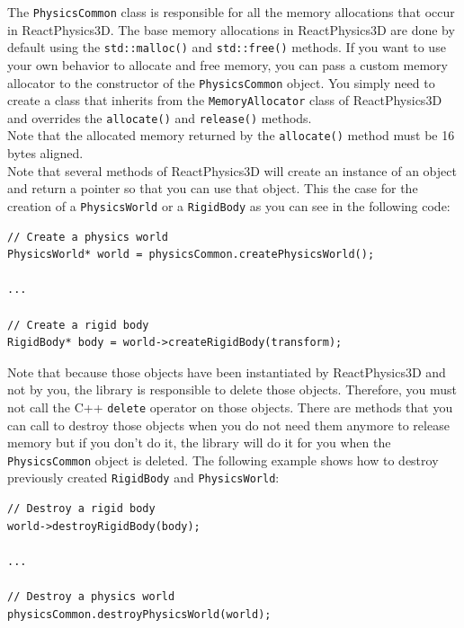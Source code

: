 \documentclass[a4paper,12pt]{article}
\begin{document}
   The \texttt{PhysicsCommon} class is responsible for all the memory allocations that occur in ReactPhysics3D. The base memory allocations in ReactPhysics3D
   are done by default using the \texttt{std::malloc()} and \texttt{std::free()} methods. If you want to use your own behavior to allocate and free
   memory, you can pass a custom memory allocator to the constructor of the \texttt{PhysicsCommon} object. You simply need to create a class
   that inherits from the \texttt{MemoryAllocator} class of ReactPhysics3D and overrides the \texttt{allocate()} and \texttt{release()} methods. \\

   Note that the allocated memory returned by the \texttt{allocate()} method must be 16 bytes aligned. \\

   Note that several methods of ReactPhysics3D will create an instance of an object and return a pointer so that you can use that object. This the case
   for the creation of a \texttt{PhysicsWorld} or a \texttt{RigidBody} as you can see in the following code: \\

   \begin{lstlisting}
// Create a physics world
PhysicsWorld* world = physicsCommon.createPhysicsWorld();

...

// Create a rigid body
RigidBody* body = world->createRigidBody(transform);
   \end{lstlisting}

   \vspace{0.6cm}

   Note that because those objects have been instantiated by ReactPhysics3D and not by you, the library is responsible to delete those objects. Therefore,
   you must not call the C++ \texttt{delete} operator on those objects. There are methods that you can call to destroy those objects when you do not need
   them anymore to release memory but if you don't do it, the library will do it for you when the \texttt{PhysicsCommon} object is deleted. The
   following example shows how to destroy previously created \texttt{RigidBody} and \texttt{PhysicsWorld}: \\

   \begin{lstlisting}
// Destroy a rigid body
world->destroyRigidBody(body);

...

// Destroy a physics world
physicsCommon.destroyPhysicsWorld(world);
   \end{lstlisting}
\end{document}
